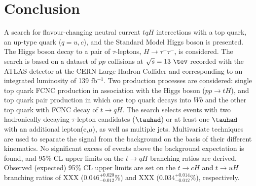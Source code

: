 \section{Conclusion}
\label{sec:conclusion}

A search for flavour-changing neutral current $tqH$ interections with a top quark,	an up-type quark ($q=u, c$), and the
Standard Model Higgs boson is presented. The Higgs boson decay to a pair of $\tau$-leptons, $H\rightarrow \tau^+\tau^-$, is considered.
The search is based on a dataset of $pp$ collisions at $\sqrt{s}=13~\tev$ recorded with the ATLAS detector at the
CERN Large Hadron Collider and corresponding to an integrated luminosity of 139 fb$^{-1}$.
Two production processes are considered:  single top quark FCNC production in association with the Higgs boson ($pp\rightarrow tH$), and top quark pair production in
which one top quark decays into $Wb$ and the other top quark with FCNC decay of $t\rightarrow qH$.
The search selects events with two hadronically decaying $\tau$-lepton candidates ($\tauhad$) or at least one $\tauhad$ with an additional lepton(e,$\mu$),
as well as multiple jets.
Multivariate techniques are used to separate the signal from the background on the basis of their different kinematics.
No significant excess of events above the background expectation is found, and 95\% CL upper limits on the $t\to qH$ branching ratios are derived.
Observed (expected) 95\% CL upper limits are set on the $t\to cH$ and $t\to uH$ branching ratios of XXX ($0.046^{+0.020}_{-0.012}\%$)
and XXX ($0.034^{+0.014}_{-0.012}\%$), respectively.
